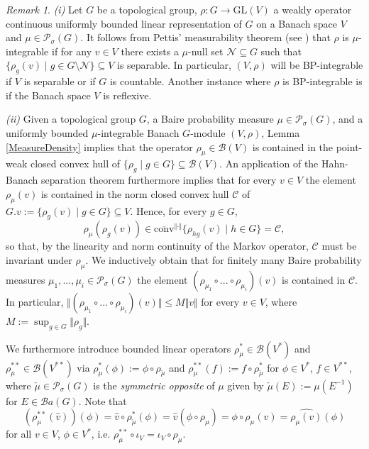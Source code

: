 \documentclass[a4paper,11pt,reqno]{amsart}
\numberwithin{equation}{section}
\theoremstyle{definition}
\theoremstyle{remark}
\theoremstyle{remark}
\newtheorem{remark}[theorem]{Remark}
\begin{document}
\begin{remark} \label{BPRemarks} \emph{(i)} Let $G$ be a topological group, $\rho:G\rightarrow\text{GL}(V)$ a weakly operator continuous uniformly bounded linear representation of $G$ on a Banach space $V$ and $\mu\in\mathcal{P}_{\sigma}(G)$. It follows from Pettis' measurability theorem (see \cite[Theorem 1.1]{Pettis}) that $\rho$ is $\mu$-integrable if for any $v\in V$ there exists a $\mu$-null set $\mathcal{N}\subseteq G$ such that $\{\rho_{g}(v)\mid g\in G\setminus\mathcal{N}\}\subseteq V$ is separable. In particular, $(V,\rho)$ will be BP-integrable if $V$ is separable or if $G$ is countable. Another instance where $\rho$ is BP-integrable is if the Banach space $V$ is reflexive.

\emph{(ii)} Given a topological group $G$, a Baire probability measure $\mu\in\mathcal{P}_{\sigma}(G)$, and a uniformly bounded $\mu$-integrable Banach $G$-module $(V,\rho)$, Lemma \ref{MeasureDensity} implies that the operator $\rho_{\mu}\in\mathcal{B}(V)$ is contained in the point-weak closed convex hull of $\{\rho_{g}\mid g\in G\}\subseteq\mathcal{B}(V)$. An application of the Hahn-Banach separation theorem furthermore implies that for every $v\in V$ the element $\rho_{\mu}(v)$ is contained in the norm closed convex hull $\mathcal{C}$ of $G.v:=\{\rho_{g}(v)\mid g\in G\}\subseteq V$. Hence, for every $g\in G$, 
\[
\rho_{\mu}(\rho_{g}(v))\in\overline{\text{conv}}^{\Vert\cdot\Vert}\{\rho_{hg}(v)\mid h \in G\}=\mathcal{C},
\]
so that, by the linearity and norm continuity of the Markov operator, $\mathcal{C}$ must be invariant under $\rho_{\mu}$. We inductively obtain that for finitely many Baire probability measures $\mu_{1},...,\mu_{i}\in\mathcal{P}_{\sigma}(G)$ the element $(\rho_{\mu_{1}}\circ...\circ\rho_{\mu_{i}})(v)$ is contained in $\mathcal{C}$. In particular, $\Vert(\rho_{\mu_{1}}\circ...\circ\rho_{\mu_{i}})(v)\Vert\leq M\Vert v\Vert$ for every $v\in V$, where $M:=\sup_{g\in G}\Vert\rho_{g}\Vert$. \end{remark}

We furthermore introduce bounded linear operators $\rho_{\mu}^{\ast}\in\mathcal{B}(V^{\ast})$ and $\rho_{\mu}^{\ast\ast}\in\mathcal{B}(V^{\ast\ast})$ via $\rho_{\mu}^{\ast}(\phi):=\phi\circ\rho_{\check{\mu}}$ and $\rho_{\mu}^{\ast\ast}(f):=f\circ\rho_{\check{\mu}}^{\ast}$ for $\phi\in V^{\ast}$, $f\in V^{\ast\ast}$, where $\check{\mu}\in\mathcal{P}_{\sigma}(G)$ is the \emph{symmetric opposite} of $\mu$ given by $\check{\mu}(E):=\mu(E^{-1})$ for $E\in\mathcal{B}a(G)$. Note that 
\begin{equation}
\left(\rho_{\mu}^{\ast\ast}(\widehat{v})\right)(\phi)=\widehat{v}\circ\rho_{\check{\mu}}^{\ast}(\phi)=\widehat{v}(\phi\circ\rho_{\mu})=\phi\circ\rho_{\mu}(v)=\widehat{\rho_{\mu}(v)}(\phi)\label{eq:Compatibility}
\end{equation}
for all $v\in V$, $\phi\in V^{\ast}$, i.e. $\rho_{\mu}^{\ast\ast}\circ\iota_{V}=\iota_{V}\circ\rho_{\mu}$.
\end{document}
